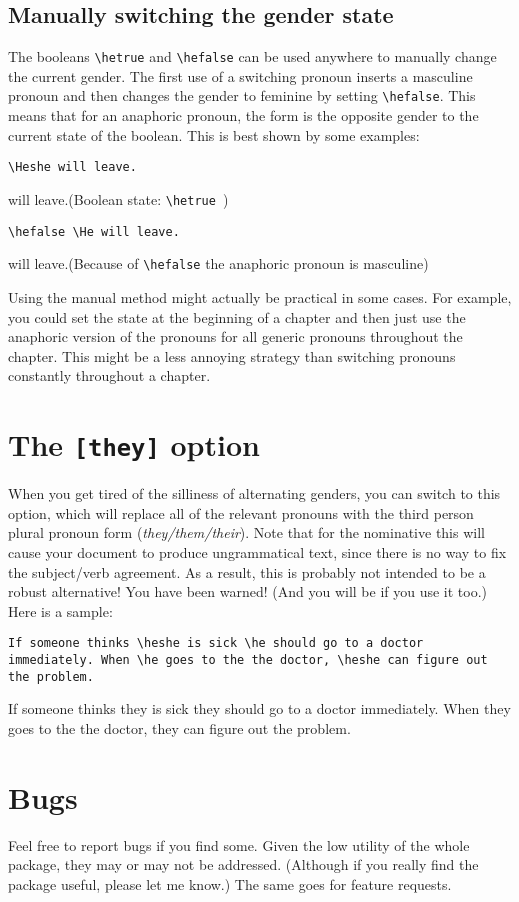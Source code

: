 \documentclass[11pt]{article}
\newcommand*\bs{\textbackslash}
\newcommand*{\pkg}[1]{\texttt{#1}\xspace}
\begin{document}
\subsection{Manually switching the gender state}
The booleans \pkg{\bs hetrue} and \pkg{\bs hefalse} can be used anywhere to manually change the current gender. The first use of a switching pronoun inserts a masculine pronoun and then changes the gender to feminine by setting \pkg{\bs hefalse}. This means that for an anaphoric pronoun, the form is the opposite gender to the current state of the boolean.  This is best shown by some examples:

\begin{exe}
\ex\label{booleans}
\begin{xlist}
\ex \begin{lstlisting}
\Heshe will leave.
\end{lstlisting}
\ex \hefalse\Heshe will leave.\hfill(Boolean state: \pkg{\bs hetrue })
\ex\begin{lstlisting}
\hefalse \He will leave.
\end{lstlisting}
\ex \hefalse \He will leave.\hfill(Because of \pkg{\bs hefalse} the anaphoric pronoun is masculine)
\end{xlist}
\end{exe}

Using the manual method might actually be practical in some cases.  For example, you could set the state at the beginning of a chapter and then just use the anaphoric version of the pronouns for all generic pronouns throughout the chapter.  This might be a less annoying strategy than switching pronouns constantly throughout a chapter.
\section{The \pkg{[they]} option}
When you get tired of the silliness of alternating genders, you can switch to
this option, which will replace all of the relevant pronouns with the third
person plural pronoun form (\emph{they/them/their}).  Note that for the nominative
this will cause your document to produce ungrammatical text, since there is 
no way to fix the subject/verb agreement. As a result, this is probably not intended to be a robust alternative! You have been warned! (And you will be if you use it too.) Here is a sample:
\begin{exe}
\ex\label{they}
\begin{xlist}
\ex \begin{lstlisting}
If someone thinks \heshe is sick \he should go to a doctor immediately. When \he goes to the the doctor, \heshe can figure out the problem.
\end{lstlisting}
\ex If someone thinks they is sick they should go to a doctor immediately. When they goes to the the doctor, they can figure out the problem.
\end{xlist}
\end{exe}
\section{Bugs}
Feel free to report bugs if you find some. Given the low utility of the whole package, they may or may not be addressed. (Although if you really find the package useful, please let me know.)  The same goes for feature requests.
\end{document}
